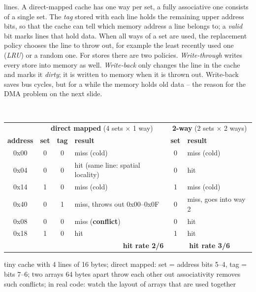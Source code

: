 \begin{description}
{lines. A direct-mapped cache has one way per set, a fully associative one
consists of a single set. The \emph{tag} stored with each line holds the
remaining upper address bits, so that the cache can tell which memory
address a line belongs to; a \emph{valid} bit marks lines that hold data.
When all ways of a set are used, the replacement policy chooses the line to
throw out, for example the least recently used one (\emph{LRU}) or a random
one. For stores there are two policies. \emph{Write-through} writes every
store into memory as well. \emph{Write-back} only changes the line in the
cache and marks it \emph{dirty}; it is written to memory when it is thrown
out. Write-back saves bus cycles, but for a while the memory holds old data
-- the reason for the DMA problem on the next slide.}
\os{\newpage}

\item[{\rot\bf Cache example: hits, misses, conflicts}]~\\[-\lblskip]
\begin{center}
{\small
\begin{tabular}{|c|c|c|l||c|l|}
\hline
 & \multicolumn{3}{c||}{\textbf{direct mapped} (4 sets $\times$ 1 way)} & \multicolumn{2}{c|}{\textbf{2-way} (2 sets $\times$ 2 ways)} \\
\textbf{address} & \textbf{set} & \textbf{tag} & \textbf{result} & \textbf{set} & \textbf{result} \\
\hline
0x00 & 0 & 0 & \textcolor{red!70!black}{miss} (cold) & 0 & \textcolor{red!70!black}{miss} (cold) \\
0x04 & 0 & 0 & \textcolor{green!50!black}{hit} (same line: spatial locality) & 0 & \textcolor{green!50!black}{hit} \\
0x14 & 1 & 0 & \textcolor{red!70!black}{miss} (cold) & 1 & \textcolor{red!70!black}{miss} (cold) \\
0x40 & 0 & 1 & \textcolor{red!70!black}{miss}, throws out 0x00--0x0F & 0 & \textcolor{red!70!black}{miss}, goes into way 2 \\
0x08 & 0 & 0 & \textcolor{red!70!black}{miss} (\textbf{conflict}) & 0 & \textcolor{green!50!black}{hit} \\
0x18 & 1 & 0 & \textcolor{green!50!black}{hit} & 1 & \textcolor{green!50!black}{hit} \\
\hline
\multicolumn{4}{|r||}{\textbf{hit rate 2/6}} & \multicolumn{2}{c|}{\textbf{hit rate 3/6}} \\
\hline
\end{tabular}}
\end{center}
\bi
	\ite tiny cache with 4 lines of 16 bytes; direct mapped: set = address bits 5--4, tag = bits 7--6; two arrays 64 bytes apart throw each other out
	\ite associativity removes such conflicts; in real code: watch the layout of arrays that are used together
\ei
\os{\newpage}


\end{description}
